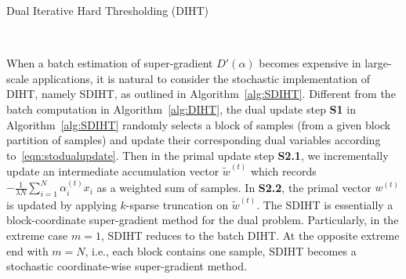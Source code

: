 \documentclass[11pt]{article}
\numberwithin{equation}{section}
\numberwithin{table}{section}
\numberwithin{figure}{section}
\begin{document}
\begin{algorithm}[tb]\caption{Dual Iterative Hard Thresholding (DIHT)}
\label{alg:DIHT}
 \\
\end{algorithm}

When a batch estimation of super-gradient $D'(\alpha)$ becomes expensive in large-scale applications, it is natural to consider the stochastic implementation of DIHT, namely SDIHT, as outlined in Algorithm~\ref{alg:SDIHT}. Different from the batch computation in Algorithm~\ref{alg:DIHT}, the dual update step \textbf{S1} in Algorithm~\ref{alg:SDIHT} randomly selects a block of samples (from a given block partition of samples) and update their corresponding dual variables according to~\eqref{eqn:stodualupdate}. Then in the primal update step \textbf{S2.1}, we incrementally update an intermediate accumulation vector $\tilde w^{(t)}$ which records $-\frac{1}{\lambda N}\sum_{i=1}^N \alpha_i^{(t)}x_i$ as a weighted sum of samples. In \textbf{S2.2}, the primal vector $w^{(t)}$ is updated by applying $k$-sparse truncation on $\tilde w^{(t)}$. The SDIHT is essentially a block-coordinate super-gradient method for the dual problem. Particularly, in the extreme case $m=1$, SDIHT reduces to the batch DIHT. At the opposite extreme end with $m=N$, i.e., each block contains one sample, SDIHT becomes a stochastic coordinate-wise super-gradient method.
\end{document}
